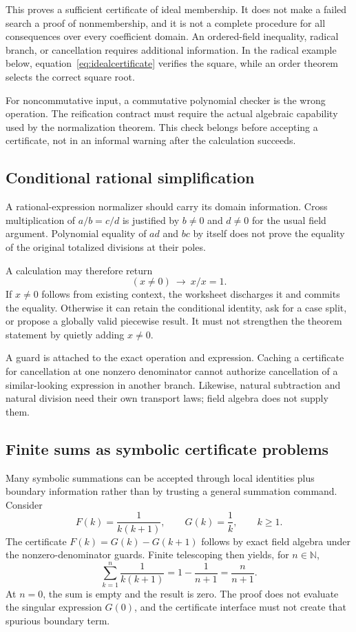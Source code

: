 \documentclass[11pt,a4paper]{article}
\newcommand{\N}{\mathbb{N}}
\theoremstyle{definition}
\begin{document}
This proves a sufficient certificate of ideal membership. It does not make a
failed search a proof of nonmembership, and it is not a complete procedure for
all consequences over every coefficient domain. An ordered-field inequality,
radical branch, or cancellation requires additional information. In the radical
example below, equation~\eqref{eq:idealcertificate} verifies the square, while
an order theorem selects the correct square root.

For noncommutative input, a commutative polynomial checker is the wrong
operation. The reification contract must require the actual algebraic capability
used by the normalization theorem. This check belongs before accepting a
certificate, not in an informal warning after the calculation succeeds.

\subsection{Conditional rational simplification}
A rational-expression normalizer should carry its domain information. Cross
multiplication of $a/b=c/d$ is justified by $b\ne0$ and $d\ne0$ for the usual
field argument. Polynomial equality of $ad$ and $bc$ by itself does not prove
the equality of the original totalized divisions at their poles.

A calculation may therefore return
\[
 (x\ne0)\ \longrightarrow\ x/x=1.
\]
If $x\ne0$ follows from existing context, the worksheet discharges it and
commits the equality. Otherwise it can retain the conditional identity, ask
for a case split, or propose a globally valid piecewise result. It must not
strengthen the theorem statement by quietly adding $x\ne0$.

A guard is attached to the exact operation and expression. Caching a certificate
for cancellation at one nonzero denominator cannot authorize cancellation of a
similar-looking expression in another branch. Likewise, natural subtraction
and natural division need their own transport laws; field algebra does not
supply them.

\subsection{Finite sums as symbolic certificate problems}
Many symbolic summations can be accepted through local identities plus boundary
information rather than by trusting a general summation command. Consider
\[
 F(k)=\frac1{k(k+1)},\qquad
 G(k)=\frac1k,\qquad k\ge1.
\]
The certificate $F(k)=G(k)-G(k+1)$ follows by exact field algebra under the
nonzero-denominator guards. Finite telescoping then yields, for $n\in\N$,
\[
 \sum_{k=1}^{n}\frac1{k(k+1)}=1-\frac1{n+1}=\frac n{n+1}.
\]
At $n=0$, the sum is empty and the result is zero. The proof does not evaluate
the singular expression $G(0)$, and the certificate interface must not create
that spurious boundary term.
\end{document}
